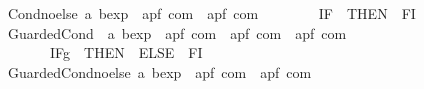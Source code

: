 \begin{isabellebody}
\ \ {\isachardoublequoteopen}{\isacharunderscore}Cond{\isacharunderscore}no{\isacharunderscore}else{\isachardoublequoteclose}{\isacharcolon}{\isacharcolon}\ {\isachardoublequoteopen}{\isacharprime}a\ bexp\ {\isacharequal}{\isachargreater}\ {\isacharparenleft}{\isacharprime}a{\isacharcomma}{\isacharprime}p{\isacharcomma}{\isacharprime}f{\isacharparenright}\ com\ {\isacharequal}{\isachargreater}\ {\isacharparenleft}{\isacharprime}a{\isacharcomma}{\isacharprime}p{\isacharcomma}{\isacharprime}f{\isacharparenright}\ com{\isachardoublequoteclose}\isanewline
\ \ \ \ \ \ \ \ {\isacharparenleft}{\isachardoublequoteopen}{\isacharparenleft}{}IF\ {\isacharparenleft}{\isacharunderscore}{\isacharparenright}{\isacharslash}\ {\isacharparenleft}{}THEN{\isacharslash}\ {\isacharunderscore}{\isacharparenright}{\isacharslash}\ FI{\isacharparenright}{\isachardoublequoteclose}\ {\isacharbrackleft}{}{\isacharcomma}\ {}{\isacharbrackright}\ {}{}{\isacharparenright}\isanewline
\ \ {\isachardoublequoteopen}{\isacharunderscore}GuardedCond{\isachardoublequoteclose}\ {\isacharcolon}{\isacharcolon}\ {\isachardoublequoteopen}{\isacharprime}a\ bexp\ {\isacharequal}{\isachargreater}\ {\isacharparenleft}{\isacharprime}a{\isacharcomma}{\isacharprime}p{\isacharcomma}{\isacharprime}f{\isacharparenright}\ com\ {\isacharequal}{\isachargreater}\ {\isacharparenleft}{\isacharprime}a{\isacharcomma}{\isacharprime}p{\isacharcomma}{\isacharprime}f{\isacharparenright}\ com\ {\isacharequal}{\isachargreater}\ {\isacharparenleft}{\isacharprime}a{\isacharcomma}{\isacharprime}p{\isacharcomma}{\isacharprime}f{\isacharparenright}\ com{\isachardoublequoteclose}\isanewline
\ \ \ \ \ \ \ \ {\isacharparenleft}{\isachardoublequoteopen}{\isacharparenleft}{}IF\isactrlsub g\ {\isacharparenleft}{\isacharunderscore}{\isacharparenright}{\isacharslash}\ {\isacharparenleft}{}THEN\ {\isacharunderscore}{\isacharparenright}{\isacharslash}\ {\isacharparenleft}{}ELSE\ {\isacharunderscore}{\isacharparenright}{\isacharslash}\ FI{\isacharparenright}{\isachardoublequoteclose}\ {\isacharbrackleft}{}{\isacharcomma}\ {}{\isacharcomma}\ {}{\isacharbrackright}\ {}{}{\isacharparenright}\isanewline
\ \ {\isachardoublequoteopen}{\isacharunderscore}GuardedCond{\isacharunderscore}no{\isacharunderscore}else{\isachardoublequoteclose}{\isacharcolon}{\isacharcolon}\ {\isachardoublequoteopen}{\isacharprime}a\ bexp\ {\isacharequal}{\isachargreater}\ {\isacharparenleft}{\isacharprime}a{\isacharcomma}{\isacharprime}p{\isacharcomma}{\isacharprime}f{\isacharparenright}\ com\ {\isacharequal}{\isachargreater}\ {\isacharparenleft}{\isacharprime}a{\isacharcomma}{\isacharprime}p{\isacharcomma}{\isacharprime}f{\isacharparenright}\ com{\isachardoublequoteclose}\isanewline

\end{isabellebody}
